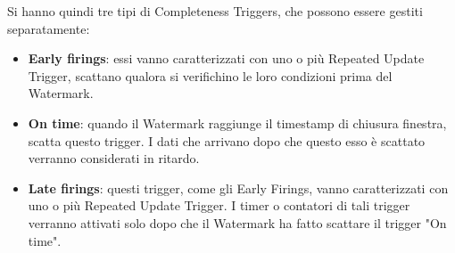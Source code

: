 Si hanno quindi tre tipi di Completeness Triggers, che possono essere gestiti separatamente:
\begin{itemize}
	\item \textbf{Early firings}: essi vanno caratterizzati con uno o più Repeated Update Trigger, scattano qualora si verifichino le loro condizioni prima del Watermark.
	\item \textbf{On time}: quando il Watermark raggiunge il timestamp di chiusura finestra, scatta questo trigger. I dati che arrivano dopo che questo esso è scattato verranno considerati in ritardo.
	\item \textbf{Late firings}: questi trigger, come gli Early Firings, vanno caratterizzati con uno o più Repeated Update Trigger. I timer o contatori di tali trigger verranno attivati solo dopo che il Watermark ha fatto scattare il trigger "On time".
\end{itemize}

